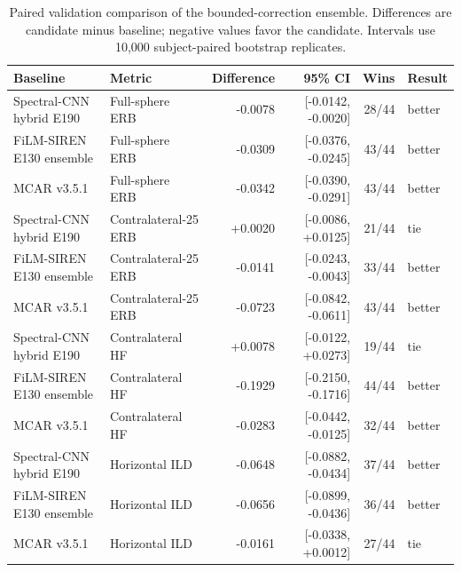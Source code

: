 \begin{table}[t]
\centering
\caption{Paired validation comparison of the bounded-correction ensemble. Differences are candidate minus baseline; negative values favor the candidate. Intervals use 10,000 subject-paired bootstrap replicates.}
\label{tab:bounded-paired-validation}
\begin{tabular}{llrrrl}
\toprule
Baseline & Metric & Difference & 95\% CI & Wins & Result \\
\midrule
Spectral-CNN hybrid E190 & Full-sphere ERB & -0.0078 & [-0.0142, -0.0020] & 28/44 & better \\
FiLM-SIREN E130 ensemble & Full-sphere ERB & -0.0309 & [-0.0376, -0.0245] & 43/44 & better \\
MCAR v3.5.1 & Full-sphere ERB & -0.0342 & [-0.0390, -0.0291] & 43/44 & better \\
Spectral-CNN hybrid E190 & Contralateral-25 ERB & +0.0020 & [-0.0086, +0.0125] & 21/44 & tie \\
FiLM-SIREN E130 ensemble & Contralateral-25 ERB & -0.0141 & [-0.0243, -0.0043] & 33/44 & better \\
MCAR v3.5.1 & Contralateral-25 ERB & -0.0723 & [-0.0842, -0.0611] & 43/44 & better \\
Spectral-CNN hybrid E190 & Contralateral HF & +0.0078 & [-0.0122, +0.0273] & 19/44 & tie \\
FiLM-SIREN E130 ensemble & Contralateral HF & -0.1929 & [-0.2150, -0.1716] & 44/44 & better \\
MCAR v3.5.1 & Contralateral HF & -0.0283 & [-0.0442, -0.0125] & 32/44 & better \\
Spectral-CNN hybrid E190 & Horizontal ILD & -0.0648 & [-0.0882, -0.0434] & 37/44 & better \\
FiLM-SIREN E130 ensemble & Horizontal ILD & -0.0656 & [-0.0899, -0.0436] & 36/44 & better \\
MCAR v3.5.1 & Horizontal ILD & -0.0161 & [-0.0338, +0.0012] & 27/44 & tie \\
\bottomrule
\end{tabular}
\end{table}
